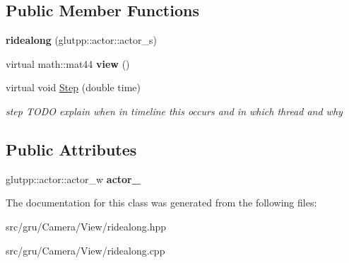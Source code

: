 \subsection*{\-Public \-Member \-Functions}
\begin{DoxyCompactItemize}
\item 
\hypertarget{classglutpp_1_1Camera_1_1View_1_1ridealong_ae6b8552cf2fc6ca0892276225f367483}{{\bfseries ridealong} (glutpp\-::actor\-::actor\-\_\-s)}\label{classglutpp_1_1Camera_1_1View_1_1ridealong_ae6b8552cf2fc6ca0892276225f367483}

\item 
\hypertarget{classglutpp_1_1Camera_1_1View_1_1ridealong_a501bf0c20a3a707bb0ebad0dcb994519}{virtual math\-::mat44 {\bfseries view} ()}\label{classglutpp_1_1Camera_1_1View_1_1ridealong_a501bf0c20a3a707bb0ebad0dcb994519}

\item 
\hypertarget{classglutpp_1_1Camera_1_1View_1_1ridealong_a881a7ae916cb2f71344f04617fa30e19}{virtual void \hyperlink{classglutpp_1_1Camera_1_1View_1_1ridealong_a881a7ae916cb2f71344f04617fa30e19}{\-Step} (double time)}\label{classglutpp_1_1Camera_1_1View_1_1ridealong_a881a7ae916cb2f71344f04617fa30e19}

\begin{DoxyCompactList}\small\item\em step \-T\-O\-D\-O explain when in timeline this occurs and in which thread and why \end{DoxyCompactList}\end{DoxyCompactItemize}
\subsection*{\-Public \-Attributes}
\begin{DoxyCompactItemize}
\item 
\hypertarget{classglutpp_1_1Camera_1_1View_1_1ridealong_abf4b639b7731da7c44d2b4b6625c89b9}{glutpp\-::actor\-::actor\-\_\-w {\bfseries actor\-\_\-}}\label{classglutpp_1_1Camera_1_1View_1_1ridealong_abf4b639b7731da7c44d2b4b6625c89b9}

\end{DoxyCompactItemize}


\-The documentation for this class was generated from the following files\-:\begin{DoxyCompactItemize}
\item 
src/gru/\-Camera/\-View/ridealong.\-hpp\item 
src/gru/\-Camera/\-View/ridealong.\-cpp\end{DoxyCompactItemize}
